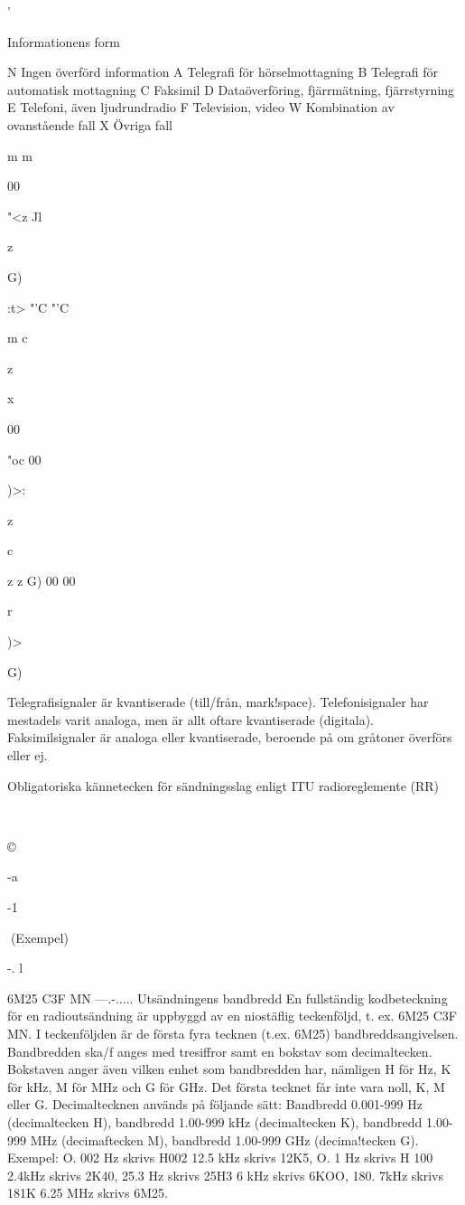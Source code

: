'

Informationens form

N Ingen överförd information
A Telegrafi
för hörselmottagning
B Telegrafi
för automatisk mottagning
C Faksimil
D Dataöverföring,
fjärrmätning,
fjärrstyrning
E Telefoni,
även ljudrundradio
F Television, video
W Kombination av
ovanstående fall
X Övriga fall

m
m

00

"<z
Jl

z

G)

:t>
"'C
"'C

m
c

z

x

00

"oc
00

)>:

z

c

z
z
G)
00
00

r

)>

G)

Telegrafisignaler är kvantiserade (till/från,
mark!space). Telefonisignaler har mestadels
varit analoga, men är allt oftare kvantiserade
(digitala). Faksimilsignaler är analoga eller
kvantiserade, beroende på om gråtoner överförs eller ej.

Obligatoriska kännetecken
för sändningsslag enligt
ITU radioreglemente (RR)

~

©

-a

-1

(Exempel)

-. l

6M25
C3F MN
---.-.....
Utsändningens bandbredd
En fullständig kodbeteckning för en radioutsändning är uppbyggd av en niostäflig teckenföljd, t. ex.
6M25 C3F MN. I teckenföljden är de första fyra
tecknen (t.ex. 6M25) bandbreddsangivelsen.
Bandbredden ska/f anges med tresiffror samt en
bokstav som decimaltecken.
Bokstaven anger även vilken enhet som bandbredden har, nämligen H för Hz, K för kHz, M för
MHz och G för GHz.
Det första tecknet får inte vara noll, K, M eller G.
Decimaltecknen används på följande sätt:
Bandbredd 0.001-999 Hz (decimaltecken H),
bandbredd 1.00-999 kHz (decimaltecken K),
bandbredd 1.00-999 MHz (decimaftecken M),
bandbredd 1.00-999 GHz (decima!tecken G).
Exempel:
O. 002 Hz skrivs H002
12.5 kHz skrivs 12K5,
O. 1 Hz
skrivs H 100 2.4kHz
skrivs 2K40,
25.3 Hz skrivs 25H3 6 kHz
skrivs 6KOO,
180. 7kHz
skrivs 181K
6.25 MHz
skrivs
6M25.

